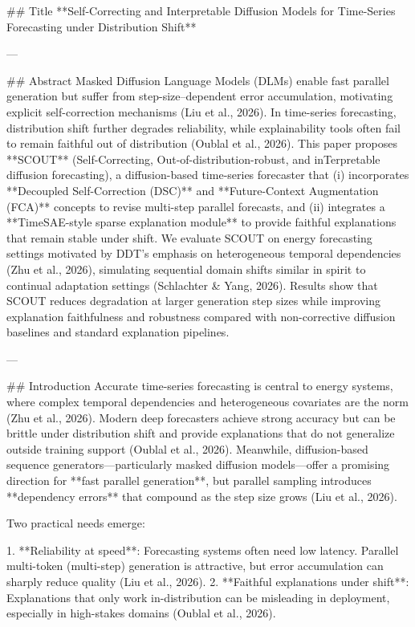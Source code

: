 ## Title  
**Self-Correcting and Interpretable Diffusion Models for Time-Series Forecasting under Distribution Shift**

---

## Abstract  
Masked Diffusion Language Models (DLMs) enable fast parallel generation but suffer from step-size–dependent error accumulation, motivating explicit self-correction mechanisms (Liu et al., 2026). In time-series forecasting, distribution shift further degrades reliability, while explainability tools often fail to remain faithful out of distribution (Oublal et al., 2026). This paper proposes **SCOUT** (Self-Correcting, Out-of-distribution-robust, and inTerpretable diffusion forecasting), a diffusion-based time-series forecaster that (i) incorporates **Decoupled Self-Correction (DSC)** and **Future-Context Augmentation (FCA)** concepts to revise multi-step parallel forecasts, and (ii) integrates a **TimeSAE-style sparse explanation module** to provide faithful explanations that remain stable under shift. We evaluate SCOUT on energy forecasting settings motivated by DDT’s emphasis on heterogeneous temporal dependencies (Zhu et al., 2026), simulating sequential domain shifts similar in spirit to continual adaptation settings (Schlachter & Yang, 2026). Results show that SCOUT reduces degradation at larger generation step sizes while improving explanation faithfulness and robustness compared with non-corrective diffusion baselines and standard explanation pipelines.

---

## Introduction  
Accurate time-series forecasting is central to energy systems, where complex temporal dependencies and heterogeneous covariates are the norm (Zhu et al., 2026). Modern deep forecasters achieve strong accuracy but can be brittle under distribution shift and provide explanations that do not generalize outside training support (Oublal et al., 2026). Meanwhile, diffusion-based sequence generators—particularly masked diffusion models—offer a promising direction for **fast parallel generation**, but parallel sampling introduces **dependency errors** that compound as the step size grows (Liu et al., 2026).  

Two practical needs emerge:

1. **Reliability at speed**: Forecasting systems often need low latency. Parallel multi-token (multi-step) generation is attractive, but error accumulation can sharply reduce quality (Liu et al., 2026).  
2. **Faithful explanations under shift**: Explanations that only work in-distribution can be misleading in deployment, especially in high-stakes domains (Oublal et al., 2026).

